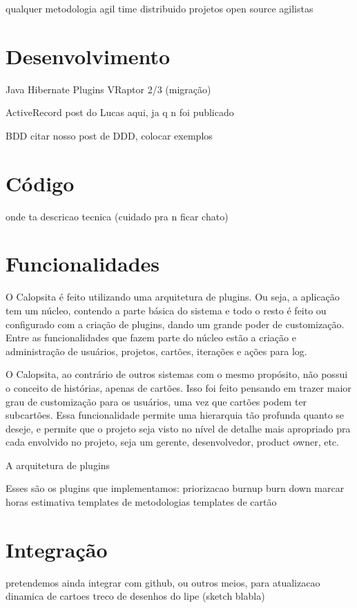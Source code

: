 \documentclass[titlepage,a4paper]{article}
\begin{document}
qualquer metodologia agil
time distribuido
projetos open source
agilistas

\section{Desenvolvimento}
Java
Hibernate
Plugins
VRaptor 2/3 (migração)

ActiveRecord
post do Lucas aqui, ja q n foi publicado

BDD
citar nosso post de DDD, colocar exemplos

\section{Código}

onde ta
descricao tecnica (cuidado pra n ficar chato)

\section{Funcionalidades}

O Calopsita é feito utilizando uma arquitetura de plugins. Ou seja, a aplicação tem um núcleo, contendo a parte básica do sistema e todo o resto é feito ou configurado com a criação de plugins, dando um grande poder de customização.
Entre as funcionalidades que fazem parte do núcleo estão a criação e administração de usuários,
projetos, cartões, iterações e ações para log.

O Calopsita, ao contrário de outros sistemas com o mesmo propósito, não possui o conceito de histórias, apenas de cartões. Isso foi feito pensando em trazer maior grau de customização para os usuários, uma vez que cartões podem ter subcartões. Essa funcionalidade permite uma hierarquia tão profunda quanto se deseje, e permite que o projeto seja visto no nível de detalhe mais apropriado pra cada envolvido no projeto, seja um gerente, desenvolvedor, product owner, etc.

A arquitetura de plugins

Esses são os plugins que implementamos:
priorizacao
burnup
burn down
marcar horas
estimativa
templates de metodologias
templates de cartão

\section{Integração}
pretendemos ainda integrar com github, ou outros meios, para atualizacao dinamica de cartoes
treco de desenhos do lipe (sketch blabla)
\end{document}
